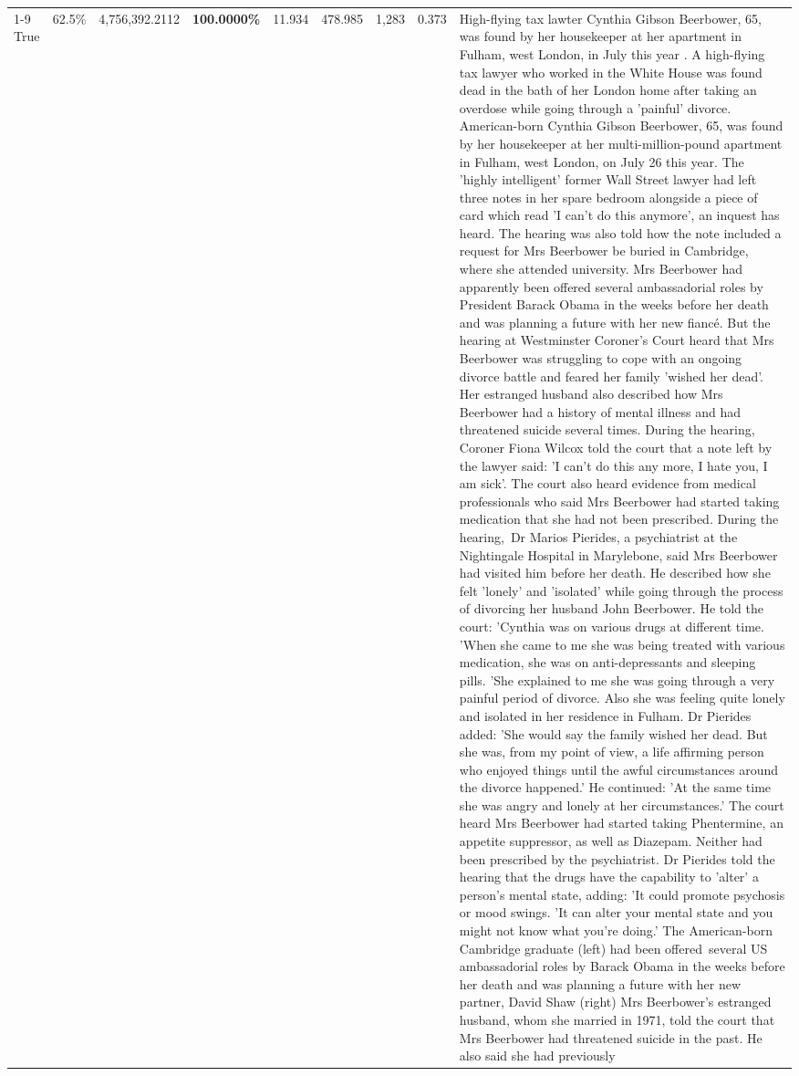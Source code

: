 \begin{table}[H]
\begin{tabular}{lllrlllll}
\cline{1-9}
True & 62.5\% & 4,756,392.2112 & \bfseries \color{red} 100.0000\% & 11.934 & 478.985 & 1,283 & 0.373 & High-flying tax lawter Cynthia Gibson Beerbower, 65, was found by her housekeeper at her apartment in Fulham, west London, in July this year . A high-flying tax lawyer who worked in the White House was found dead in the bath of her London home after taking an overdose while going through a 'painful' divorce. American-born Cynthia Gibson Beerbower, 65, was found by her housekeeper at her multi-million-pound apartment in Fulham, west London, on July 26 this year. The 'highly intelligent' former Wall Street lawyer had left three notes in her spare bedroom alongside a piece of card which read 'I can't do this anymore', an inquest has heard. The hearing was also told how the note included a request for Mrs Beerbower be buried in Cambridge, where she attended university. Mrs Beerbower had apparently been offered several ambassadorial roles by President Barack Obama in the weeks before her death and was planning a future with her new fiancé. But the hearing at Westminster Coroner's Court heard that Mrs Beerbower was struggling to cope with an ongoing divorce battle and feared her family 'wished her dead'. Her estranged husband also described how Mrs Beerbower had a history of mental illness and had threatened suicide several times. During the hearing, Coroner Fiona Wilcox told the court that a note left by the lawyer said: 'I can't do this any more, I hate you, I am sick'. The court also heard evidence from medical professionals who said Mrs Beerbower had started taking medication that she had not been prescribed. During the hearing, Dr Marios Pierides, a psychiatrist at the Nightingale Hospital in Marylebone, said Mrs Beerbower had visited him before her death. He described how she felt 'lonely' and 'isolated' while going through the process of divorcing her husband John Beerbower. He told the court: 'Cynthia was on various drugs at different time. 'When she came to me she was being treated with various medication, she was on anti-depressants and sleeping pills. 'She explained to me she was going through a very painful period of divorce. Also she was feeling quite lonely and isolated in her residence in Fulham. Dr Pierides added: 'She would say the family wished her dead. But she was, from my point of view, a life affirming person who enjoyed things until the awful circumstances around the divorce happened.' He continued: 'At the same time she was angry and lonely at her circumstances.' The court heard Mrs Beerbower had started taking Phentermine, an appetite suppressor, as well as Diazepam. Neither had been prescribed by the psychiatrist. Dr Pierides told the hearing that the drugs have the capability to 'alter' a person's mental state, adding: 'It could promote psychosis or mood swings. 'It can alter your mental state and you might not know what you're doing.' The American-born Cambridge graduate (left) had been offered several US ambassadorial roles by Barack Obama in the weeks before her death and was planning a future with her new partner, David Shaw (right) Mrs Beerbower's estranged husband, whom she married in 1971, told the court that Mrs Beerbower had threatened suicide in the past. He also said she had previously 
\end{tabular}
\end{table}

